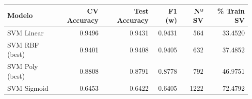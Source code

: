 \begin{tabular}{lrrrrr}
\toprule
Modelo & CV Accuracy & Test Accuracy & F1 (w) & Nº SV & \% Train SV \\
\midrule
SVM Linear & 0.9496 & 0.9431 & 0.9431 & 564 & 33.4520 \\
SVM RBF (best) & 0.9401 & 0.9408 & 0.9405 & 632 & 37.4852 \\
SVM Poly (best) & 0.8808 & 0.8791 & 0.8778 & 792 & 46.9751 \\
SVM Sigmoid & 0.6453 & 0.6422 & 0.6405 & 1222 & 72.4792 \\
\bottomrule
\end{tabular}
